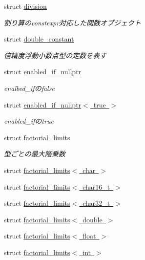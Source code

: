 \begin{DoxyCompactItemize}
struct \mbox{\hyperlink{structsaki_1_1division}{division}}
\begin{DoxyCompactList}\small\item\em 割り算のconstexpr対応した関数オブジェクト \end{DoxyCompactList}\item 
struct \mbox{\hyperlink{structsaki_1_1double__constant}{double\+\_\+constant}}
\begin{DoxyCompactList}\small\item\em 倍精度浮動小数点型の定数を表す \end{DoxyCompactList}\item 
struct \mbox{\hyperlink{structsaki_1_1enabled__if__nullptr}{enabled\+\_\+if\+\_\+nullptr}}
\begin{DoxyCompactList}\small\item\em enalbed\+\_\+ifのfalse \end{DoxyCompactList}\item 
struct \mbox{\hyperlink{structsaki_1_1enabled__if__nullptr_3_01true_01_4}{enabled\+\_\+if\+\_\+nullptr$<$ true $>$}}
\begin{DoxyCompactList}\small\item\em enabled\+\_\+ifのtrue \end{DoxyCompactList}\item 
struct \mbox{\hyperlink{structsaki_1_1factorial__limits}{factorial\+\_\+limits}}
\begin{DoxyCompactList}\small\item\em 型ごとの最大階乗数 \end{DoxyCompactList}\item 
struct \mbox{\hyperlink{structsaki_1_1factorial__limits_3_01char_01_4}{factorial\+\_\+limits$<$ char $>$}}
\item 
struct \mbox{\hyperlink{structsaki_1_1factorial__limits_3_01char16__t_01_4}{factorial\+\_\+limits$<$ char16\+\_\+t $>$}}
\item 
struct \mbox{\hyperlink{structsaki_1_1factorial__limits_3_01char32__t_01_4}{factorial\+\_\+limits$<$ char32\+\_\+t $>$}}
\item 
struct \mbox{\hyperlink{structsaki_1_1factorial__limits_3_01double_01_4}{factorial\+\_\+limits$<$ double $>$}}
\item 
struct \mbox{\hyperlink{structsaki_1_1factorial__limits_3_01float_01_4}{factorial\+\_\+limits$<$ float $>$}}
\item 
struct \mbox{\hyperlink{structsaki_1_1factorial__limits_3_01int_01_4}{factorial\+\_\+limits$<$ int $>$}}

\end{DoxyCompactItemize}
